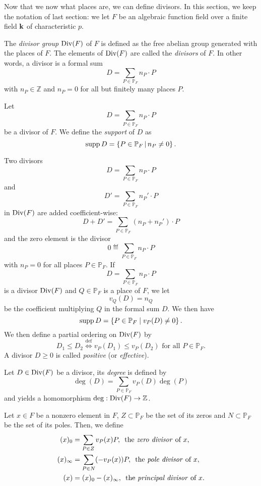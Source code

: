 Now that we now what places are, we can define divisors. In this section, we
keep the notation of last section: we let $F$ be an algebraic function field
over a finite field $\mathbf{k}$ of characteristic $p$.
\begin{defi}[Divisor]
  The \emph{divisor group} $\operatorname{Div}(F)$ of $F$ is defined as the free abelian group generated
  with the places of $F$. The elements of $\operatorname{Div}(F)$ are called the
  \emph{divisors} of $F$. In other words, a divisor is a formal sum
  \[
    D = \sum_{P\in\mathbb{P}_F} n_P\cdot P
  \]
  with $n_P\in\mathbb{Z}$ and $n_P=0$ for all but finitely many places $P$.
\end{defi}
\begin{defi}[Support]
  Let 
  \[
    D = \sum_{P\in\mathbb{P}_F} n_P\cdot P
  \]
  be a divisor of $F$. We define the \emph{support} of $D$ as
  \[
    \operatorname{supp} D = \left\{ P\in\mathbb{P}_F\,|\,n_P\neq 0 \right\}.
  \]
\end{defi}
Two divisors 
\[
  D = \sum_{P\in\mathbb{P}_F} n_P\cdot P
\]
and
\[
  D' = \sum_{P\in\mathbb{P}_F} n_P'\cdot P
\]
in $\operatorname{Div}(F)$ are added coefficient-wise:
\[
  D+D' = \sum_{P\in\mathbb{P}_F} (n_P+n_P')\cdot P
\]
and the zero element is the divisor
\[
  0 \eqdef \sum_{P\in\mathbb{P}_F} n_P\cdot P
\]
with $n_P=0$ for all places $P\in\mathbb{P}_F$. If
\[
  D = \sum_{P\in\mathbb{P}_F}n_P\cdot P
\]
is a divisor $\operatorname{Div}(F)$ and $Q\in\mathbb{P}_F$ is a place of $F$, we let 
\[
  v_Q(D) = n_Q
\]
be the coefficient multiplying $Q$ in the formal sum $D$. We then have
\[
  \operatorname{supp} D = \left\{ P\in\mathbb{P}_F\mid v_P(D)\neq 0 \right\}.
\]
We then define a partial ordering on $\operatorname{Div}(F)$ by
\[
  D_1 \leq D_2 \overset{\text{def}}{\Longleftrightarrow} v_P(D_1)\leq v_P(D_2)\text{ for all
  }P\in\mathbb{P}_F.
\]
A divisor $D\geq 0$ is called \emph{positive} (or \emph{effective}).
\begin{defi}[Degree]
  Let $D\in\operatorname{Div}(F)$ be a divisor, its \emph{degree} is defined by
  \[
    \deg(D) = \sum_{P\in\mathbb{P}_F}v_P(D)\deg(P)
  \]
  and yields a homomorphism $\deg:\operatorname{Div}(F)\to\mathbb{Z}$.
\end{defi}
\begin{defi}
  Let $x\in F$ be a nonzero element in $F$, $Z\subset\mathbb{P}_F$ be the set of
  its zeros and $N\subset\mathbb{P}_F$ be the set of its poles. Then, we define
  \begin{align*}
    (x)_0 &= \sum_{P\in Z}v_P(x)P ,\,\text{ the \emph{zero divisor} of }x,\\
    (x)_\infty &= \sum_{P\in N}(-v_P(x))P ,\,\text{ the \emph{pole divisor} of
  }x,\\
    (x) &= (x)_0 - (x)_\infty ,\,\text{ the \emph{principal divisor} of }x.
  \end{align*}
\end{defi}

